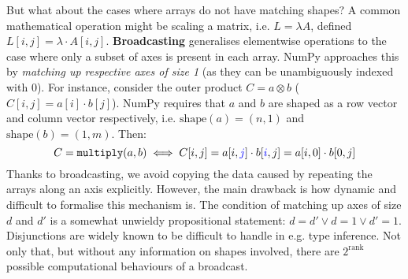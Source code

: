 But what about the cases where arrays do not have matching shapes? A common mathematical operation might be scaling a matrix, i.e. $L = \lambda A$, defined $L[i, j] = \lambda \cdot A[i, j]$. \textbf{Broadcasting} generalises elementwise operations to the case where only a subset of axes is present in each array. NumPy approaches this by \textit{matching up respective axes of size 1} (as they can be unambiguously indexed with $0$). For instance, consider the outer product $C = a \otimes b$ ($C[i, j] = a[i] \cdot b[j] $). NumPy requires that $a$ and $b$ are shaped as a row vector and column vector respectively, i.e. $\mathrm{shape}(a) = (n, 1)$ and $\mathrm{shape}(b) = (1, m)$. Then:
$$ C = \texttt{multiply}(a, b) \iff C[i, j] = a[i, {\color{blue} j}] \cdot b[{\color{blue} i}, j] = a[i, 0] \cdot b[0, j] $$
Thanks to broadcasting, we avoid copying the data caused by repeating the arrays along an axis explicitly. However, the main drawback is how dynamic and difficult to formalise this mechanism is. The condition of matching up axes of size $d$ and $d'$ is a somewhat unwieldy propositional statement: $d = d' \lor d = 1 \lor d' = 1 $. Disjunctions are widely known to be difficult to handle in e.g. type inference.
Not only that, but without any information on shapes involved, there are $2^{\mathrm{rank}}$ possible computational behaviours of a broadcast.

